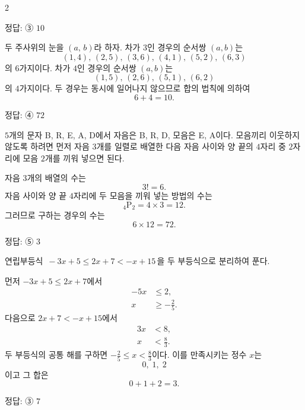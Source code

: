 \documentclass[10pt]{article}
\begin{document}
\raggedcolumns
\begin{multicols}{2}

\begin{answerbox}정답: ③ $10$\end{answerbox}

두 주사위의 눈을 $(a,\,b)$라 하자. 차가 $3$인 경우의 순서쌍 $(a,b)$는
\[ (1,4),\,(2,5),\,(3,6),\,(4,1),\,(5,2),\,(6,3) \]
의 $6$가지이다. 차가 $4$인 경우의 순서쌍 $(a,b)$는
\[ (1,5),\,(2,6),\,(5,1),\,(6,2) \]
의 $4$가지이다. 두 경우는 동시에 일어나지 않으므로 합의 법칙에 의하여
\[ 6 + 4 = 10. \]

\begin{answerbox}정답: ④ $72$\end{answerbox}

$5$개의 문자 B, R, E, A, D에서 자음은 B, R, D, 모음은 E, A이다. 모음끼리 이웃하지 않도록 하려면 먼저 자음 $3$개를 일렬로 배열한 다음 자음 사이와 양 끝의 $4$자리 중 $2$자리에 모음 $2$개를 끼워 넣으면 된다.

자음 $3$개의 배열의 수는
\[ 3! = 6. \]
자음 사이와 양 끝 $4$자리에 두 모음을 끼워 넣는 방법의 수는
\[ {}_4\mathrm{P}_2 = 4 \times 3 = 12. \]
그러므로 구하는 경우의 수는
\[ 6 \times 12 = 72. \]

\begin{answerbox}정답: ⑤ $3$\end{answerbox}

연립부등식 $\,-3x + 5 \le 2x + 7 < -x + 15\,$을 두 부등식으로 분리하여 푼다.

먼저 $-3x + 5 \le 2x + 7$에서
\begin{align*}
-5x &\le 2, \\
x &\ge -\tfrac{2}{5}.
\end{align*}
다음으로 $2x + 7 < -x + 15$에서
\begin{align*}
3x &< 8, \\
x &< \tfrac{8}{3}.
\end{align*}
두 부등식의 공통 해를 구하면 $-\tfrac{2}{5} \le x < \tfrac{8}{3}$이다. 이를 만족시키는 정수 $x$는
\[ 0,\;1,\;2 \]
이고 그 합은
\[ 0 + 1 + 2 = 3. \]

\begin{answerbox}정답: ③ $7$\end{answerbox}


\end{multicols}
\end{document}
